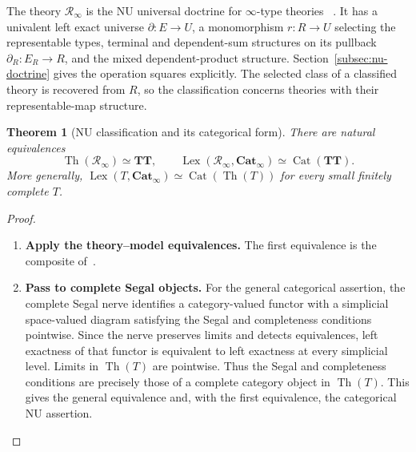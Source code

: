\documentclass[oneside]{article}
\theoremstyle{plain}
\newtheorem{theorem}{Theorem}[section]
\theoremstyle{definition}
\theoremstyle{remark}
\newcommand{\Cat}{\mathbf{Cat}_{\infty}}
\newcommand{\Lex}{\operatorname{Lex}}
\newcommand{\RNU}{\mathcal R_{\infty}}
\newcommand{\TT}{\mathbf{TT}}
\newcommand{\Th}{\operatorname{Th}}
\begin{document}
The theory $\RNU$ is the NU universal doctrine for $\infty$-type theories ~\cite[Def.~5.27 and \S5]{NguyenUemura2025}. It has a univalent left exact universe $\partial:E\to U$, a monomorphism $r:R\to U$ selecting the representable types, terminal and dependent-sum structures on its pullback $\partial_R:E_R\to R$, and the mixed dependent-product structure. Section~\ref{subsec:nu-doctrine} gives the operation squares explicitly. The selected class of a classified theory is recovered from $R$, so the classification concerns theories with their representable-map structure.

\begin{theorem}[NU classification and its categorical form]
\label{thm:nu-categorical}
    There are natural equivalences
    \[
        \Th(\RNU)\simeq\TT,
        \qquad
        \Lex(\RNU,\Cat)\simeq\operatorname{Cat}(\TT).
    \]
    More generally, $\Lex(T,\Cat)\simeq\operatorname{Cat}(\Th(T))$ for every small finitely complete $T$.
\end{theorem}
\begin{proof}
    \leavevmode
    \begin{enumerate}
        \item \textbf{Apply the theory--model equivalences.} The first equivalence is the composite of~\cite[Thms.~4.14 and~5.29]{NguyenUemura2025}.
        
        \item \textbf{Pass to complete Segal objects.} For the general categorical assertion, the complete Segal nerve identifies a category-valued functor with a simplicial space-valued diagram satisfying the Segal and completeness conditions pointwise. Since the nerve preserves limits and detects equivalences, left exactness of that functor is equivalent to left exactness at every simplicial level. Limits in $\Th(T)$ are pointwise. Thus the Segal and completeness conditions are precisely those of a complete category object in $\Th(T)$. This gives the general equivalence and, with the first equivalence, the categorical NU assertion.\qedhere
    \end{enumerate}
\end{proof}
\end{document}
